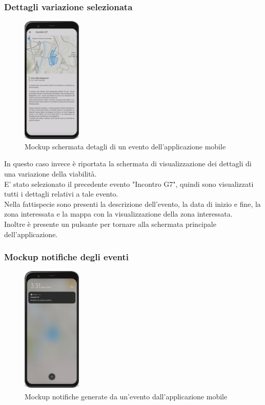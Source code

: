 \documentclass{article}
\begin{document}
\subsubsection{Dettagli variazione selezionata}
\begin{figure}[htbp]
    \label{fig:Dettaglio_evento}
    \centering
    \includegraphics[width=0.25\textwidth]{Images/Mockup2 - Mobile.png}
    \caption{Mockup schermata detagli di un evento dell'applicazione mobile}
\end{figure}

In questo caso invece è riportata la schermata di visualizzazione dei dettagli di una variazione della viabilità.\\
E' stato selezionato il precedente evento "Incontro G7", quindi sono visualizzati tutti i dettagli relativi a tale evento.\\
Nella fattispecie sono presenti la descrizione dell'evento, la data di inizio e fine, la zona interessata e la mappa con la visualizzazione della zona interessata.\\
Inoltre è presente un pulsante per tornare alla schermata principale dell'applicazione.\\
\clearpage

\subsubsection{Mockup notifiche degli eventi}

\begin{figure}[htbp]
    \label{fig:Notifica_evento}
    \centering
    \includegraphics[width=0.25\textwidth]{Images/Mockup3 - Mobile.png}
    \caption{Mockup notifiche generate da un'evento dall'applicazione mobile}
\end{figure}
\end{document}
